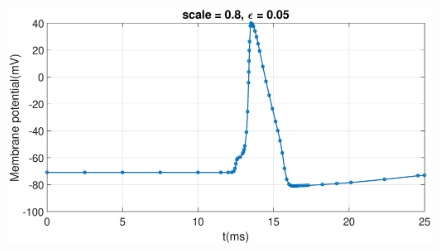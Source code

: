 \documentclass[12pt,a4paper]{article}
\begin{document}
\begin{CJK}{UTF8}{bsmi}
\begin{figure}[htbp]
	\end{figure}
	\begin{figure}[htbp]
		\centering
		\includegraphics[width = 500pt]{805.eps}
	\end{figure}
	\end{CJK}
\end{document}
